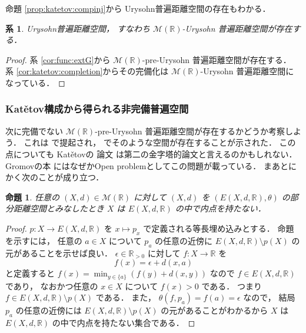\documentclass[leqno, 12pt]{jsarticle}
\newtheorem{prop}[thm]{命題}
\newtheorem{cor}[thm]{系}
\newcommand{\rr}{\mathbb{R}}
\newcommand{\Met}[1]{\mathscr{M}(#1)}
\newcommand{\Espace}[3]{E(#1,#2,#3)}
\newcommand{\KatDist}{\theta}
\newcommand{\kura}[1]{p_{#1}}
\newcommand{\pospart}[1]{#1_{>0}}
\newcommand{\rrpos}{\pospart{\rr}}
\begin{document}
命題
\ref{prop:katetov:compinj}から
Urysohn普遍距離空間の存在もわかる．
\begin{cor}\label{cor:kat-ury}
Urysohn普遍距離空間，
すなわち
$\Met{\rr}$-Urysohn
普遍距離空間が存在する．
\end{cor}
\begin{proof}
系
\ref{cor:func:extG}から
$\Met{\rr}$-pre-Urysohn
普遍距離空間が存在する．
系
\ref{cor:katetov:completion}からその完備化は
$\Met{\rr}$-Urysohn
普遍距離空間になっている．
\end{proof}

\subsubsection{\texorpdfstring{Kat\v{e}tov}{Katetov}構成から得られる非完備普遍空間}\label{subsubsec:function-envelope:katetov-noncomplete}
次に完備でない
$\Met{\rr}$-pre-Urysohn
普遍距離空間が存在するかどうか考察しよう．
これは
\cite{Ury2}
で提起され，
\cite{Ka}
でそのような空間が存在することが示された．
この点についても
Kat\v{e}tovの
論文
\cite{Ka}
は第二の金字塔的論文と言えるのかもしれない．
Gromovの本
\cite{Greenbook}
にはなぜかOpen problemとしてこの問題が載っている．
まあとにかく次のことが成り立つ．
\begin{prop}\label{prop:naitennasi}
任意の
$(X, d)\in \Met{\rr}$
に対して
$(X, d)$
を
$(\Espace{X}{d}{\rr}, \KatDist)$
の部分距離空間とみなしたとき
$X$
は
$\Espace{X}{d}{\rr}$
の中で内点を持たない．
\end{prop}
\begin{proof}
$p\colon X\to \Espace{X}{d}{\rr}$
を
 $x\mapsto \kura{x}$
 で定義される等長埋め込みとする．
命題を示すには，
任意の
$a\in X$
について
$\kura{a}$
の任意の近傍に
$\Espace{X}{d}{\rr}\setminus p(X)$
の元があることを示せば良い．
$\epsilon\in \rrpos$
に対して
$f\colon X\to \rr$%
を
\[
f(x)=\epsilon+d(x, a)
\]
と定義すると
$f(x)=\min_{y\in \{a\}}(f(y)+d(x, y))$
なので
$f\in \Espace{X}{d}{\rr}$
であり，
なおかつ任意の
$x\in X$%
について
$f(x)>0$
である．
つまり
$f\in \Espace{X}{d}{\rr}\setminus p(X)$
である．
また，
$\KatDist(f, \kura{a})=f(a)=\epsilon$
なので，
結局
$\kura{a}$
の任意の近傍には
$\Espace{X}{d}{\rr}\setminus p(X)$
の元があることがわかるから
$X$
は
$\Espace{X}{d}{\rr}$
の中で内点を持たない集合である．
\end{proof}
\end{document}
